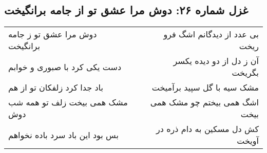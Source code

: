 \begin{center}
\section*{غزل شماره ۲۶: دوش مرا عشق تو از جامه برانگیخت}
\label{sec:026}
\begin{longtable}{l p{0.5cm} r}
دوش مرا عشق تو ز جامه برانگیخت
&&
بی عدد از دیدگانم اشگ فرو ریخت
\\
دست یکی کرد با صبوری و خوابم
&&
آن ز دل از دو دیده یکسر بگریخت
\\
باد جدا کرد زلفکان تو از هم
&&
مشک سیه با گل سپید برآمیخت
\\
مشک همی بیخت زلف تو همه شب دوش
&&
اشگ همی بیختم چو مشک همی بیخت
\\
بس بود این باد سرد باده نخواهم
&&
کش دل مسکین به دام ذره در آویخت
\\
\end{longtable}
\end{center}
